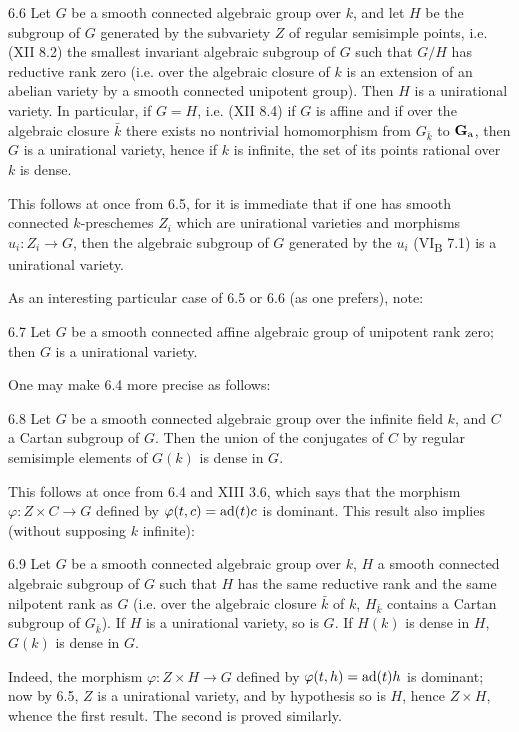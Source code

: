 \begin{corollary}{6.6}\label{XIV.6.6}
Let $G$ be a smooth
connected algebraic
group over $k$,
and let $H$ be
the subgroup of
$G$ generated by
the subvariety $Z$
of regular semisimple
points, i.e. (XII
8.2) the smallest
invariant algebraic
subgroup of $G$
such that $G/H$
has reductive rank
zero (i.e. over
the algebraic closure
of $k$ is an
extension of an
abelian variety by
a smooth connected
unipotent group).
Then $H$ is a
unirational variety.
In particular, if
$G=H$, i.e. (XII
8.4) if $G$ is
affine and if over
the algebraic closure
$\bar k$ there
exists no nontrivial
homomorphism from
$G_{\bar k}$ to
$\mathbf{G}_{\mathrm{a}}$, then $G$
is a unirational
variety, hence if
$k$ is infinite,
the set of its
points rational over
$k$ is dense.
\end{corollary}
This follows at
once from 6.5,
for it is immediate
that if one has
smooth connected
$k$-preschemes $Z_i$
which are unirational
varieties and
morphisms
$u_i:Z_i\to G$,
then the algebraic
subgroup of $G$
generated by the
$u_i$ (VI\textsubscript{B}
7.1) is a
unirational variety.

As an interesting
particular case of
6.5 or 6.6 (as
one prefers), note:
\begin{corollary}{6.7}\label{XIV.6.7}
Let $G$ be a smooth
connected affine
algebraic group of
unipotent rank zero;
then $G$ is a
unirational variety.
\end{corollary}
One may make 6.4
more precise as
follows:
\begin{corollary}{6.8}\label{XIV.6.8}
Let $G$ be a smooth
connected algebraic
group over the
infinite field $k$,
and $C$ a Cartan
subgroup of $G$.
Then the union of
the conjugates of
$C$ by regular
semisimple elements
of $G(k)$ is dense
in $G$.
\end{corollary}
This follows at
once from 6.4
and XIII 3.6,
which says that
the morphism
$\varphi:Z\times C\to G$
defined by
$\varphi(t,c)=\operatorname{ad}(t)c$
is dominant.
This result also
implies (without
supposing $k$
infinite):
\begin{corollary}{6.9}\label{XIV.6.9}
Let $G$ be a smooth
connected algebraic
group over $k$,
$H$ a smooth
connected algebraic
subgroup of $G$
such that $H$ has
the same reductive
rank and the same
nilpotent rank as
$G$ (i.e. over
the algebraic closure
$\bar k$ of $k$,
$H_{\bar k}$ contains
a Cartan subgroup
of $G_{\bar k}$).
If $H$ is a
unirational variety,
so is $G$.
If $H(k)$ is
dense in $H$,
$G(k)$ is dense
in $G$.
\end{corollary}
Indeed, the morphism
$\varphi:Z\times H\to G$
defined by
$\varphi(t,h)=\operatorname{ad}(t)h$
is dominant; now
by 6.5, $Z$ is
a unirational variety,
and by hypothesis
so is $H$, hence
$Z\times H$, whence
the first result.
The second is
proved similarly.

